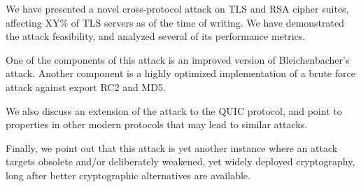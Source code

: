 We have presented a novel cross-protocol attack on TLS and RSA cipher suites,
affecting XY\% of TLS servers as of the time of writing.
We have demonstrated the attack feasibility, and analyzed several of its performance metrics.

One of the components of this attack is an improved version of Bleichenbacher's attack.
Another component is a highly optimized implementation of a brute force attack against
export RC2 and MD5.

We also discuss an extension of the attack to the QUIC protocol,
and point to properties in other modern protocols that may lead to similar attacks.

Finally, we point out that this attack is yet another instance where an attack
targets obsolete and/or deliberately weakened, yet widely deployed cryptography,
long after better cryptographic alternatives are available.

